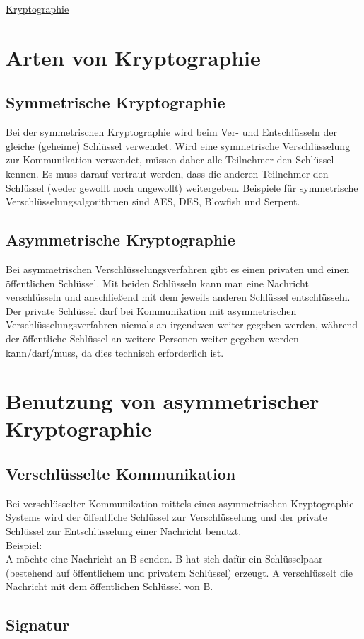 \raggedright
\footnotesize
\begin{multicols}{3}	
	\setlength{\premulticols}{1pt}
	\setlength{\postmulticols}{1pt}
	\setlength{\multicolsep}{1pt}
	\setlength{\columnsep}{2pt}

\begin{center}
     \Large{\underline{Kryptographie}} \\
\end{center}

\section{Arten von Kryptographie}
\subsection{Symmetrische Kryptographie}
Bei der symmetrischen Kryptographie wird beim Ver- und Entschlüsseln der gleiche (geheime) Schlüssel verwendet. Wird eine symmetrische Verschlüsselung zur Kommunikation verwendet, müssen daher alle Teilnehmer den Schlüssel kennen. Es muss darauf vertraut werden, dass die anderen Teilnehmer den Schlüssel (weder gewollt noch ungewollt) weitergeben.
Beispiele für symmetrische Verschlüsselungsalgorithmen sind AES, DES, Blowfish und Serpent.
\subsection{Asymmetrische Kryptographie}
Bei asymmetrischen Verschlüsselungsverfahren gibt es einen privaten und einen öffentlichen Schlüssel. Mit beiden Schlüsseln kann man eine Nachricht verschlüsseln und anschließend mit dem jeweils anderen Schlüssel entschlüsseln. Der private Schlüssel darf bei Kommunikation mit asymmetrischen Verschlüsselungsverfahren niemals an irgendwen weiter gegeben werden, während der öffentliche Schlüssel an weitere Personen weiter gegeben werden kann/darf/muss, da dies technisch erforderlich ist.
\section{Benutzung von asymmetrischer Kryptographie}
\subsection{Verschlüsselte Kommunikation}
Bei verschlüsselter Kommunikation mittels eines asymmetrischen Kryptographie-Systems wird der öffentliche Schlüssel zur Verschlüsselung und der private Schlüssel zur Entschlüsselung einer Nachricht benutzt.\\
Beispiel:\\
A möchte eine Nachricht an B senden. B hat sich dafür ein Schlüsselpaar (bestehend auf öffentlichem und privatem Schlüssel) erzeugt. A verschlüsselt die Nachricht mit dem öffentlichen Schlüssel von B.
\subsection{Signatur}

\end{multicols}